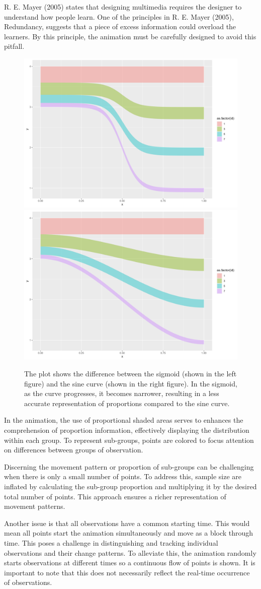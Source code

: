 R. E. Mayer (2005) states that designing multimedia requires the designer to understand how people learn. One of the principles in R. E. Mayer (2005), Redundancy, suggests that a piece of excess information could overload the learners. By this principle, the animation must be carefully designed to avoid this pitfall.

\begin{figure}
\includegraphics[width=0.5\linewidth]{figures/sigmoid-shade} \includegraphics[width=0.5\linewidth]{figures/sine-shade} \caption{The plot shows the difference between the sigmoid (shown in the left figure) and the sine curve (shown in the right figure). In the sigmoid, as the curve progresses, it becomes narrower, resulting in a less accurate representation of proportions compared to the sine curve.}\label{fig:proportional-shade}
\end{figure}

In the animation, the use of proportional shaded areas serves to enhances the comprehension of proportion information, effectively displaying the distribution within each group. To represent sub-groups, points are colored to focus attention on differences between groups of observation.

Discerning the movement pattern or proportion of sub-groups can be challenging when there is only a small number of points. To address this, sample size are inflated by calculating the sub-group proportion and multiplying it by the desired total number of points. This approach ensures a richer representation of movement patterns.

Another issue is that all observations have a common starting time. This would mean all points start the animation simultaneously and move as a block through time. This poses a challenge in distinguishing and tracking individual observations and their change patterns. To alleviate this, the animation randomly starts observations at different times so a continuous flow of points is shown. It is important to note that this does not necessarily reflect the real-time occurrence of observations.

